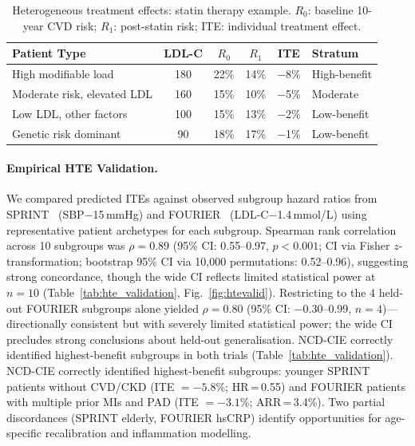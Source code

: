 \documentclass[runningheads]{llncs}
\begin{document}
\renewcommand{\arraystretch}{1.1}
\begin{table}[t]
\centering
\caption{Heterogeneous treatment effects: statin therapy example.
$R_0$: baseline 10-year CVD risk; $R_1$: post-statin risk;
ITE: individual treatment effect.}\label{tab:hte}
\small
\begin{tabular}{@{}lccccl@{}}
\toprule
\textbf{Patient Type} & \textbf{LDL-C} & \textbf{$R_0$} & \textbf{$R_1$} &
\textbf{ITE} & \textbf{Stratum} \\
\midrule
High modifiable load & 180 & 22\% & 14\% & $-$8\% & High-benefit \\
Moderate risk, elevated LDL & 160 & 15\% & 10\% & $-$5\% & Moderate \\
Low LDL, other factors & 100 & 15\% & 13\% & $-$2\% & Low-benefit \\
Genetic risk dominant & 90 & 18\% & 17\% & $-$1\% & Low-benefit \\
\bottomrule
\end{tabular}
\end{table}
\renewcommand{\arraystretch}{1.0}

\paragraph{Empirical HTE Validation.}\label{sec:htevalid}
We compared predicted ITEs against observed subgroup hazard ratios
from SPRINT~\cite{sprint2015,rostomian2020sprint} (SBP$-$15\,mmHg)
and FOURIER~\cite{sabatine2017fourier,pokrywka2019fourier}
(LDL-C$-$1.4\,mmol/L) using representative patient archetypes for
each subgroup.
Spearman rank correlation across 10 subgroups was $\rho = 0.89$
(95\% CI: 0.55--0.97, $p < 0.001$; CI via Fisher
$z$-transformation; bootstrap 95\% CI via 10{,}000 permutations:
0.52--0.96), suggesting strong concordance, though the wide CI
reflects limited statistical power at $n = 10$
(Table~\ref{tab:hte_validation}, Fig.~\ref{fig:htevalid}).
Restricting to the 4 held-out FOURIER subgroups alone yielded
$\rho = 0.80$ (95\% CI: $-$0.30--0.99, $n = 4$)---directionally
consistent but with severely limited statistical power; the wide
CI precludes strong conclusions about held-out generalisation.
NCD-CIE correctly identified highest-benefit subgroups in both
trials (Table~\ref{tab:hte_validation}).
NCD-CIE correctly identified highest-benefit subgroups: younger
SPRINT patients without CVD/CKD (ITE $= -5.8\%$; HR\,=\,0.55)
and FOURIER patients with multiple prior MIs and PAD (ITE
$= -3.1\%$; ARR\,=\,3.4\%).
Two partial discordances (SPRINT elderly, FOURIER hsCRP) identify
opportunities for age-specific recalibration and inflammation
modelling.
\end{document}
